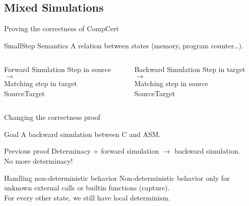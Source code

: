 \subsection{Mixed Simulations}
\begin{frame}{Proving the correctness of CompCert}
  \begin{block}{SmallStep Semantics}
    A relation between states (memory, program counter\dots).
  \end{block}
  \vfill
  \begin{columns}[T] %
    \begin{column}{.48\textwidth}
      \begin{block}{Forward Simulation}
        Step in source $\rightarrow$\\ Matching step in target\\
        {\color{blue}Source\hfill\color{red}Target}
        \forward
      \end{block}
    \end{column}%
    \hfill%
    \begin{column}{.48\textwidth}
      \begin{block}{Backward Simulation}
        Step in target $\rightarrow$\\ Matching step in source\\
        {\color{blue}Source\hfill\color{red}Target}
        \backward
      \end{block}
    \end{column}%
  \end{columns}
\end{frame}

\begin{frame}{Changing the correctness proof}
  \begin{exampleblock}{Goal}
    A backward simulation between C and ASM.
  \end{exampleblock}
  \vfill
  \begin{alertblock}{Previous proof}
    Determinacy + forward simulation $\rightarrow$ backward simulation.\\
    No more determinacy!
  \end{alertblock}
  \vfill
  \begin{exampleblock}{Handling non-deterministic behavior}
    Non-deterministic behavior only for unknown external calls or builtin functions (capture).\\
    For every other state, we still have local determinism.
  \end{exampleblock}
\end{frame}

